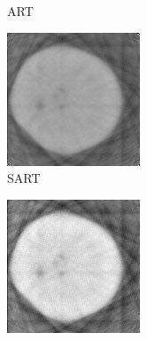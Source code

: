 \documentclass[journal]{IEEEtran}
\begin{document}
\begin{figure}[!h]
\begin{subfigure}[b]{0.24\linewidth}
        \caption{ART}
     \end{subfigure}
    \begin{subfigure}[b]{0.24\linewidth}
        \includegraphics[width=\textwidth]{../images/potato/post_tci/comparison/sart.png}
        \caption{SART}
     \end{subfigure}
    \begin{subfigure}[b]{0.24\linewidth}
        \includegraphics[width=\textwidth]{../images/potato/post_tci/comparison/sirt.png}

\end{subfigure}
\end{figure}
\end{document}
